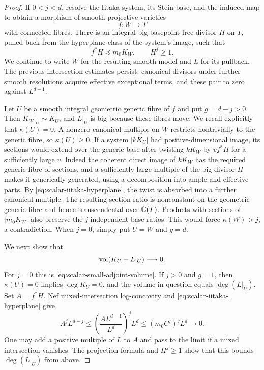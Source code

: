 \begin{proof}
If $0<j<d$, resolve the Iitaka system, its Stein base, and the induced
map to obtain a morphism of smooth projective varieties
\[
 f:W\longrightarrow T
\]
with connected fibres.  There is an integral big basepoint-free divisor
$H$ on $T$, pulled back from the hyperplane class of the system's image,
such that
\begin{equation}\label{eq:scalar-iitaka-hyperplane}
 f^*H\preceq m_0K_W,
 \qquad H^j\ge1.
\end{equation}
We continue to write $W$ for the resulting smooth model and $L$ for
its pullback.  The previous intersection estimates persist: canonical
divisors under further smooth resolutions acquire effective exceptional
terms, and these pair to zero against $L^{d-1}$.

Let $U$ be a smooth integral geometric generic fibre of $f$ and put
$g=d-j>0$.  Then $K_W|_U\sim K_U$, and $L|_U$ is big because these
fibres move.  We recall explicitly that $\kappa(U)=0$.  A nonzero
canonical multiple on $W$ restricts nontrivially to the generic fibre,
so $\kappa(U)\ge0$.  If a system $|kK_U|$ had positive-dimensional
image, its sections would extend over the generic base after twisting
$kK_W$ by $vf^*H$ for a sufficiently large $v$.  Indeed the coherent
direct image of $kK_W$ has the required generic fibre of sections,
and a sufficiently large multiple of the big divisor $H$ makes it
generically generated, using a decomposition into ample and effective
parts.  By \eqref{eq:scalar-iitaka-hyperplane}, the twist is absorbed
into a further canonical multiple.  The resulting section ratio is
nonconstant on the geometric generic fibre and hence transcendental
over $\mathbb C(T)$.  Products with sections of $|m_0K_W|$ also preserve the
$j$ independent base ratios.  This would force $\kappa(W)>j$, a
contradiction.  When $j=0$, simply put $U=W$ and $g=d$.

We next show that
\begin{equation}\label{eq:scalar-small-fibre-volume}
 \operatorname{vol}(K_U+L|_U)\longrightarrow0.
\end{equation}
For $j=0$ this is \eqref{eq:scalar-small-adjoint-volume}.  If $j>0$
and $g=1$, then $\kappa(U)=0$ implies $\deg K_U=0$, and the volume
in question equals $\deg(L|_U)$.  Set $A=f^*H$.  Nef mixed-intersection
log-concavity and \eqref{eq:scalar-iitaka-hyperplane} give
\[
 A^jL^{d-j}
 \le\left(\frac{AL^{d-1}}{L^d}\right)^jL^d
 \le (m_0C')^jL^d\longrightarrow0.
\]
One may add a positive multiple of $L$ to $A$ and pass to the limit
if a mixed intersection vanishes.  The projection formula and
$H^j\ge1$ show that this bounds $\deg(L|_U)$ from above.


\end{proof}
